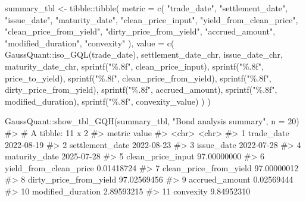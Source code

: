 \documentclass[
  letterpaper,
  DIV=11,
  numbers=noendperiod]{scrreprt}
\newenvironment{Shaded}{\begin{snugshade}}{\end{snugshade}}
\newcommand{\AttributeTok}[1]{\textcolor[rgb]{0.40,0.45,0.13}{#1}}
\newcommand{\CommentTok}[1]{\textcolor[rgb]{0.37,0.37,0.37}{#1}}
\newcommand{\DecValTok}[1]{\textcolor[rgb]{0.68,0.00,0.00}{#1}}
\newcommand{\FunctionTok}[1]{\textcolor[rgb]{0.28,0.35,0.67}{#1}}
\newcommand{\NormalTok}[1]{\textcolor[rgb]{0.00,0.23,0.31}{#1}}
\newcommand{\OtherTok}[1]{\textcolor[rgb]{0.00,0.23,0.31}{#1}}
\newcommand{\SpecialCharTok}[1]{\textcolor[rgb]{0.37,0.37,0.37}{#1}}
\newcommand{\StringTok}[1]{\textcolor[rgb]{0.13,0.47,0.30}{#1}}
\begin{document}
\begin{Shaded}
\begin{Highlighting}[]
\NormalTok{summary\_tbl }\OtherTok{\textless{}{-}}\NormalTok{ tibble}\SpecialCharTok{::}\FunctionTok{tibble}\NormalTok{(}
  \AttributeTok{metric =} \FunctionTok{c}\NormalTok{(}
    \StringTok{"trade\_date"}\NormalTok{,}
    \StringTok{"settlement\_date"}\NormalTok{,}
    \StringTok{"issue\_date"}\NormalTok{,}
    \StringTok{"maturity\_date"}\NormalTok{,}
    \StringTok{"clean\_price\_input"}\NormalTok{,}
    \StringTok{"yield\_from\_clean\_price"}\NormalTok{,}
    \StringTok{"clean\_price\_from\_yield"}\NormalTok{,}
    \StringTok{"dirty\_price\_from\_yield"}\NormalTok{,}
    \StringTok{"accrued\_amount"}\NormalTok{,}
    \StringTok{"modified\_duration"}\NormalTok{,}
    \StringTok{"convexity"}
\NormalTok{  ),}
  \AttributeTok{value =} \FunctionTok{c}\NormalTok{(}
\NormalTok{    GaussQuant}\SpecialCharTok{::}\FunctionTok{iso\_GQL}\NormalTok{(trade\_date),}
\NormalTok{    settlement\_date\_chr,}
\NormalTok{    issue\_date\_chr,}
\NormalTok{    maturity\_date\_chr,}
    \FunctionTok{sprintf}\NormalTok{(}\StringTok{"\%.8f"}\NormalTok{, clean\_price\_input),}
    \FunctionTok{sprintf}\NormalTok{(}\StringTok{"\%.8f"}\NormalTok{, price\_to\_yield),}
    \FunctionTok{sprintf}\NormalTok{(}\StringTok{"\%.8f"}\NormalTok{, clean\_price\_from\_yield),}
    \FunctionTok{sprintf}\NormalTok{(}\StringTok{"\%.8f"}\NormalTok{, dirty\_price\_from\_yield),}
    \FunctionTok{sprintf}\NormalTok{(}\StringTok{"\%.8f"}\NormalTok{, accrued\_amount),}
    \FunctionTok{sprintf}\NormalTok{(}\StringTok{"\%.8f"}\NormalTok{, modified\_duration),}
    \FunctionTok{sprintf}\NormalTok{(}\StringTok{"\%.8f"}\NormalTok{, convexity\_value)}
\NormalTok{  )}
\NormalTok{)}

\NormalTok{GaussQuant}\SpecialCharTok{::}\FunctionTok{show\_tbl\_GQH}\NormalTok{(summary\_tbl, }\StringTok{"Bond analysis summary"}\NormalTok{, }\AttributeTok{n =} \DecValTok{20}\NormalTok{)}
\CommentTok{\#\textgreater{} \# A tibble: 11 x 2}
\CommentTok{\#\textgreater{}    metric                 value      }
\CommentTok{\#\textgreater{}    \textless{}chr\textgreater{}                  \textless{}chr\textgreater{}      }
\CommentTok{\#\textgreater{}  1 trade\_date             2022{-}08{-}19 }
\CommentTok{\#\textgreater{}  2 settlement\_date        2022{-}08{-}23 }
\CommentTok{\#\textgreater{}  3 issue\_date             2022{-}07{-}28 }
\CommentTok{\#\textgreater{}  4 maturity\_date          2025{-}07{-}28 }
\CommentTok{\#\textgreater{}  5 clean\_price\_input      97.00000000}
\CommentTok{\#\textgreater{}  6 yield\_from\_clean\_price 0.01418724 }
\CommentTok{\#\textgreater{}  7 clean\_price\_from\_yield 97.00000012}
\CommentTok{\#\textgreater{}  8 dirty\_price\_from\_yield 97.02569456}
\CommentTok{\#\textgreater{}  9 accrued\_amount         0.02569444 }
\CommentTok{\#\textgreater{} 10 modified\_duration      2.89593215 }
\CommentTok{\#\textgreater{} 11 convexity              9.84952310}


\end{Highlighting}
\end{Shaded}
\end{document}
